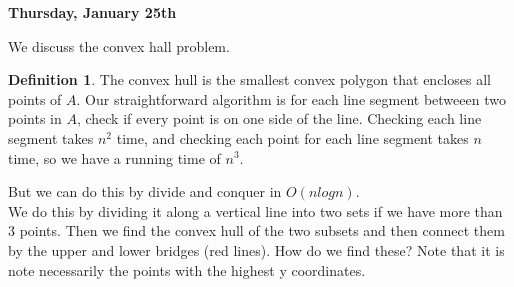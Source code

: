 \documentclass[reqno]{amsbook}
\theoremstyle{plain}
\numberwithin{section}{chapter}
\numberwithin{equation}{chapter}
\theoremstyle{definition}
\newtheorem{Def}[theorem]{Definition}
\theoremstyle{remark}
\begin{document}
\textbf{Thursday, January 25th}

We discuss the convex hall problem. 

\begin{Def}
The convex hull is the smallest convex polygon that encloses all points of $A$. Our straightforward algorithm is for each line segment betweeen two points in $A$, check if every point is on one side of the line. Checking each line segment takes $n^2$ time, and checking each point for each line segment takes $n$ time, so we have a running time of $n^3$. 
\end{Def}

But we can do this by divide and conquer in $O(nlogn)$. \\
We do this by dividing it along a vertical line into two sets if we have more than 3 points. Then we find the convex hull of the two subsets and then connect them by the upper and lower bridges (red lines). How do we find these? Note that it is note necessarily the points with the highest y coordinates. 


\end{document}
